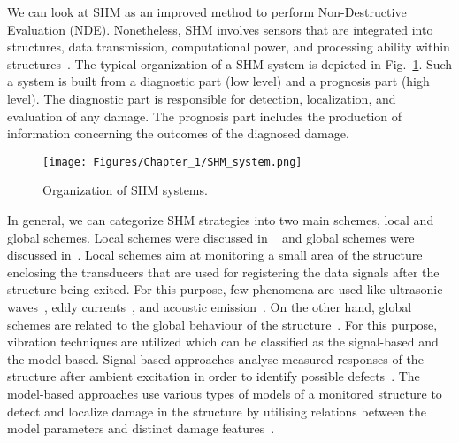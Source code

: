 We can look at SHM as an improved method to perform Non-Destructive Evaluation (NDE). 
Nonetheless, SHM involves sensors that are integrated into structures, data 
transmission, computational power, and processing ability within 
structures~\cite{Balageas2010}. 
The typical organization of a SHM system is depicted in Fig.~\ref{fig:SHMsystem}. 
Such a system is built from a diagnostic part (low level) and a prognosis part (high level).
The diagnostic part is responsible for detection, localization, and evaluation of any damage.
The prognosis part includes the production of information concerning the outcomes of the diagnosed damage.
\begin{figure} [!ht]
	\begin{center}
		\texttt{[image: Figures/Chapter\_1/SHM\_system.png]}
	\end{center}
	\caption{Organization of SHM systems.} 
	\label{fig:SHMsystem}
\end{figure}
In general, we can categorize SHM strategies into two main schemes, local and 
global schemes. Local schemes were discussed in ~\cite{Grimberg2001,Raghavan2007}
and global schemes were discussed in~\cite{Adams2002,Doebling1998,Uhl2004}. 
Local schemes aim at monitoring a small area of the structure enclosing the transducers that are used for registering the data signals after the structure being exited. 
For this purpose, few phenomena are used like ultrasonic waves~\cite{Raghavan2007}, eddy currents~\cite{Grimberg2001}, and acoustic emission~\cite{Grosse2008}. 
On the other hand, global schemes are related to the global behaviour of the structure~\cite{Balageas2010}. 
For this purpose, vibration techniques are utilized which can be classified as the signal-based and the model-based.
Signal-based approaches analyse measured responses of the structure after 
ambient excitation in order to identify possible defects~\cite{Stepinski2013}. 
The model-based approaches use various types of models of a monitored structure 
to detect and localize damage in the structure by utilising relations 
between the model parameters and distinct damage features~\cite{Stepinski2013}. 




%
%
%
%